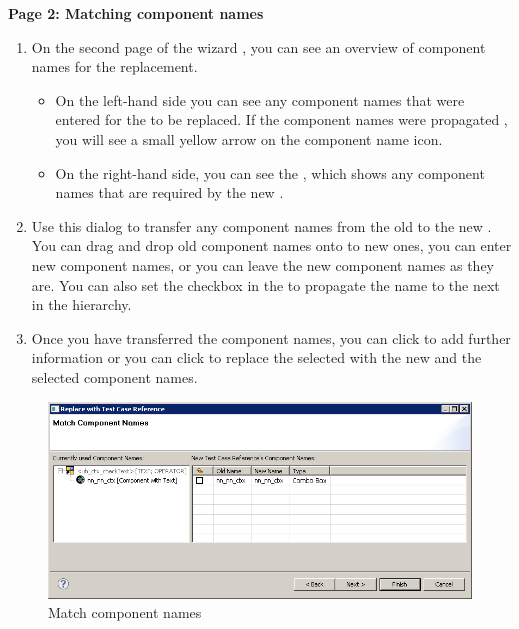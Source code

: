 \textbf{Page 2: Matching component names}
\begin{enumerate}
\item On the second page of the wizard , you can see an overview of component names for the replacement. 
\begin{itemize}
\item On the left-hand side you can see any component names that were entered for the \gdcases{} to be replaced. If the component names were propagated , you will see a small yellow arrow on the component name icon. 
\item On the right-hand side, you can see the \gdcompnamesview{}, which shows any component names that are required by the new \gdcase{}. 
\end{itemize}
\item Use this dialog to transfer any component names from the old \gdcases{} to the new \gdcases{}. You can drag and drop old component names onto to new ones, you can enter new component names, or you can leave the new component names as they are. You can also set the checkbox in the \gdcompnamesview{} to propagate the name to the next \gdcase{} in the hierarchy.  
\item Once you have transferred the component names, you can click  
to add further information
or you can click  to replace the selected \gdcases{} with the new \gdcase{} and the selected component names. 
\end{enumerate}

\begin{figure}[h]
\begin{center}
\includegraphics[width=12.5cm]{Tasks/Editors/PS/ReplaceTC_CompNames}
\caption{Match component names}
\label{ReplaceTC-CompNames}
\end{center}
\end{figure} 

